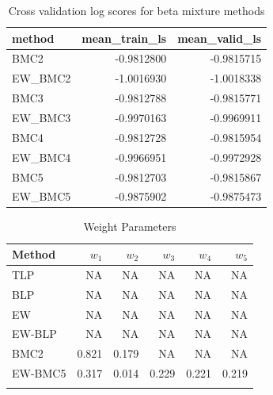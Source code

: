 \documentclass[
]{article}
\begin{document}
\begin{table}[H]

\caption{\label{tab:unnamed-chunk-11}Cross validation log scores for beta mixture methods}
\centering
\fontsize{8}{10}\selectfont
\begin{tabular}[t]{l|r|r}
\hline
method & mean\_train\_ls & mean\_valid\_ls\\
\hline
BMC2 & -0.9812800 & -0.9815715\\
\hline
EW\_BMC2 & -1.0016930 & -1.0018338\\
\hline
BMC3 & -0.9812788 & -0.9815771\\
\hline
EW\_BMC3 & -0.9970163 & -0.9969911\\
\hline
BMC4 & -0.9812728 & -0.9815954\\
\hline
EW\_BMC4 & -0.9966951 & -0.9972928\\
\hline
BMC5 & -0.9812703 & -0.9815867\\
\hline
EW\_BMC5 & -0.9875902 & -0.9875473\\
\hline
\end{tabular}
\end{table}

\begin{table}[H]

\caption{\label{tab:unnamed-chunk-11}Weight Parameters}
\centering
\fontsize{8}{10}\selectfont
\begin{tabular}[t]{lrrrrr}
\toprule{}
Method & $w_1$ & $w_2$ & $w_3$ & $w_4$ & $w_5$\\
\midrule{}
TLP & NA & NA & NA & NA & NA\\
BLP & NA & NA & NA & NA & NA\\
EW & NA & NA & NA & NA & NA\\
EW-BLP & NA & NA & NA & NA & NA\\
BMC2 & 0.821 & 0.179 & NA & NA & NA\\
\addlinespace
EW-BMC5 & 0.317 & 0.014 & 0.229 & 0.221 & 0.219\\
\bottomrule{}
\end{tabular}
\end{table}
\end{document}
